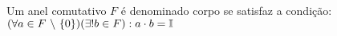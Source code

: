 \documentclass[../../main]{subfiles}
\begin{document}
    \begin{defi}[Corpo]\label{defi:corpo}
        Um anel comutativo $F$ é denominado corpo se satisfaz a condição: $(\forall a \in F\ \backslash\ \{0\})(\exists! b \in F): a\cdot b=\mathbb{I}$
    \end{defi}
\end{document}
